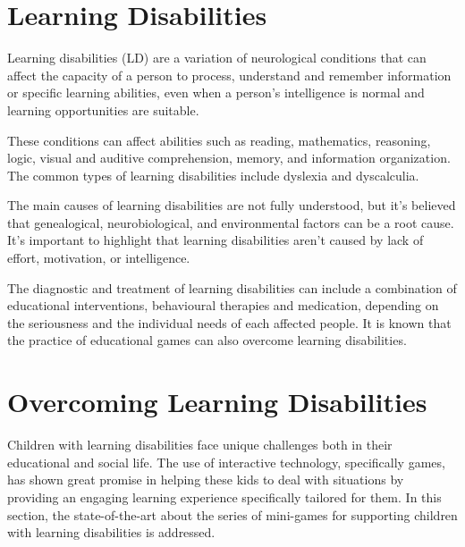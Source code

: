 \section{Learning Disabilities}
\label{section:learningdisabilityexplanation}
Learning disabilities (LD) are a variation of neurological conditions that can affect the capacity of a person to process, understand and remember information or specific learning abilities, even when a person’s intelligence is normal and learning opportunities are suitable.


These conditions can affect abilities such as reading, mathematics, reasoning, logic, visual and auditive comprehension, memory, and information organization. The common types of learning disabilities include dyslexia and dyscalculia.%

The main causes of learning disabilities are not fully understood, but it’s believed that genealogical, neurobiological, and environmental factors can be a root cause. It’s important to highlight that learning disabilities aren’t caused by lack of effort, motivation, or intelligence. 

The diagnostic and treatment of learning disabilities can include a combination of educational interventions, behavioural therapies and medication, depending on the seriousness and the individual needs of each affected people. It is known that the practice of educational games can also overcome learning disabilities.

\newpage
\section{Overcoming Learning Disabilities}
\label{sec:overcomingLds}

Children with learning disabilities face unique challenges both in their educational and social life. The use of interactive technology, specifically games, has shown great promise in helping these kids to deal with situations by providing an engaging learning experience specifically tailored for them. In this section, the state-of-the-art about the series of mini-games for supporting children with learning disabilities is addressed.

